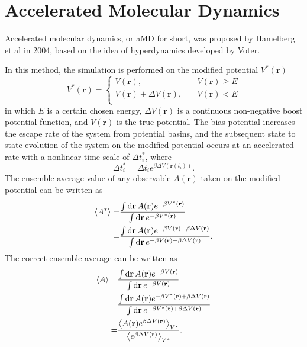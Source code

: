\section{Accelerated Molecular Dynamics\label{Sec:ES:aMD}}
Accelerated molecular dynamics, or aMD for short, was proposed by Hamelberg et al in 2004,\cite{HamelbergJCP2004} based on the idea of hyperdynamics developed by Voter\cite{VoterPRL1997}.

In this method, the simulation is performed on the modified potential $V^\ast(\mathbf{r})$
\begin{equation}
	V^\ast(\mathbf{r})= 
	\left\{ 
	\begin{array}{rl} 
		V(\mathbf{r}), &\quad V(\mathbf{r})\geq E\\ 
		V(\mathbf{r})+\Delta V(\mathbf{r}), &\quad V(\mathbf{r})< E\\  
	\end{array} 
	\right.
\end{equation}
in which $E$ is a certain chosen energy, $\Delta V(\mathbf{r})$ is a continuous non-negative boost potential function, and $V(\mathbf{r})$ is the true potential. The bias potential increases the escape rate of the system from potential basins, and the subsequent state to state evolution of the system on the modified potential occurs at an accelerated rate with a nonlinear time scale of $\Delta t^\ast_i$, where
\begin{equation}
	\Delta t^\ast_i=\Delta t_i e^{\beta \Delta V(\mathbf{r}(t_i))}.
\end{equation}
The ensemble average value of any observable $A(\mathbf{r})$ taken on the modified potential can be written as
\begin{align}
	\left<A^\ast\right>=&\frac{\int \mathop{}\!\mathrm{d} \mathbf{r}\,A(\mathbf{r})e^{-\beta V^{\ast}(\mathbf{r})}}{\int \mathop{}\!\mathrm{d} \mathbf{r}\, e^{-\beta V^{\ast}(\mathbf{r})}}\notag\\
	        =&\frac{\int \mathop{}\!\mathrm{d} \mathbf{r}\,A(\mathbf{r})e^{-\beta V(\mathbf{r})-\beta \Delta V(\mathbf{r})}}{\int \mathop{}\!\mathrm{d} \mathbf{r}\, e^{-\beta V(\mathbf{r})-\beta \Delta V(\mathbf{r})}}.
\end{align}
The correct ensemble average can be written as
\begin{align}
	\left<A\right>=&\frac{\int \mathop{}\!\mathrm{d} \mathbf{r}\,A(\mathbf{r})e^{-\beta V(\mathbf{r})}}{\int \mathop{}\!\mathrm{d} \mathbf{r}\, e^{-\beta V(\mathbf{r})}}\notag\\
	=&\frac{\int \mathop{}\!\mathrm{d} \mathbf{r}\,A(\mathbf{r})e^{-\beta V^\ast(\mathbf{r})+\beta \Delta V(\mathbf{r})}}{\int \mathop{}\!\mathrm{d} \mathbf{r}\, e^{-\beta V^\ast(\mathbf{r})+\beta \Delta V(\mathbf{r})}}\notag\\
	=&\frac{\left<A(\mathbf{r})e^{\beta \Delta V(\mathbf{r})}\right>_{V^\ast}}{\left<e^{\beta \Delta V(\mathbf{r}) }\right>_{V^\ast}}.
\end{align}

